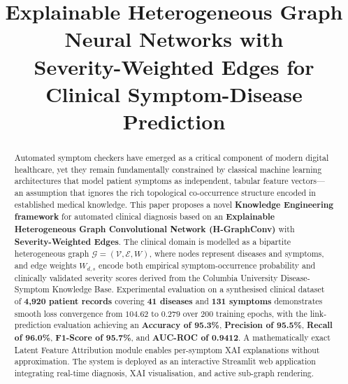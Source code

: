 \documentclass[conference]{IEEEtran}
\begin{document}
\title{Explainable Heterogeneous Graph Neural Networks with\\
       Severity-Weighted Edges for Clinical Symptom-Disease Prediction}

\author{%
}

\maketitle

\begin{abstract}
Automated symptom checkers have emerged as a critical component of
modern digital healthcare, yet they remain fundamentally constrained
by classical machine learning architectures that model patient
symptoms as independent, tabular feature vectors---an assumption that
ignores the rich topological co-occurrence structure encoded in
established medical knowledge. This paper proposes a novel
\textbf{Knowledge Engineering framework} for automated clinical
diagnosis based on an \textbf{Explainable Heterogeneous Graph
Convolutional Network (H-GraphConv)} with \textbf{Severity-Weighted
Edges}. The clinical domain is modelled as a bipartite heterogeneous
graph $\mathcal{G}=(\mathcal{V},\mathcal{E},W)$, where nodes
represent diseases and symptoms, and edge weights $W_{d,s}$ encode
both empirical symptom-occurrence probability and clinically validated
severity scores derived from the Columbia University Disease-Symptom
Knowledge Base. Experimental evaluation on a synthesised clinical
dataset of \textbf{4,920 patient records} covering \textbf{41 diseases}
and \textbf{131 symptoms} demonstrates smooth loss convergence from
$104.62$ to $0.279$ over 200 training epochs, with the link-prediction
evaluation achieving an \textbf{Accuracy of 95.3\%}, \textbf{Precision
of 95.5\%}, \textbf{Recall of 96.0\%}, \textbf{F1-Score of 95.7\%},
and \textbf{AUC-ROC of 0.9412}. A mathematically exact Latent Feature
Attribution module enables per-symptom XAI explanations without
approximation. The system is deployed as an interactive Streamlit web
application integrating real-time diagnosis, XAI visualisation, and
active sub-graph rendering.
\end{abstract}
\end{document}
